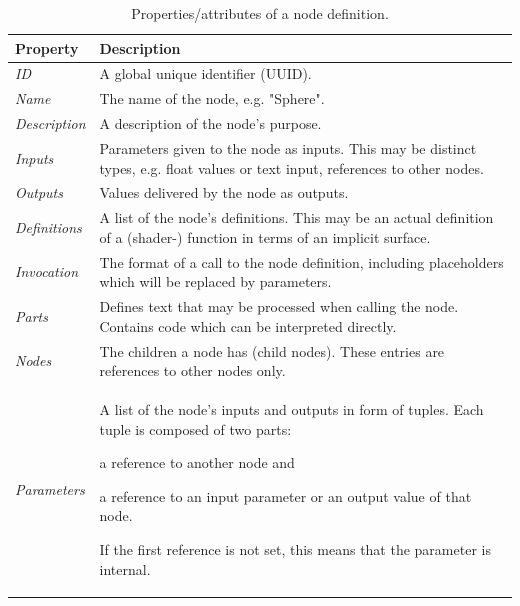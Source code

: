 \documentclass[%
    a4paper,    %
    justified,  %
    nobib,      %
    openany     %
]{tufte-book}
\newcommand{\ra}[1]{\renewcommand{\arraystretch}{#1}}
\begin{document}
\begin{table}\centering
  \ra{1.3}
  \begin{tabularx}{\textwidth}{@{}lX@{}}
    \toprule
    \textbf{Property}    & \textbf{Description}                                         \\
    \hline
    \textit{ID}          & A global unique identifier (UUID\protect\footnotemark[1]{}). \\
    \textit{Name}        & The name of the node, e.g. "Sphere".                         \\
    \textit{Description} & A description of the node's purpose.                         \\
    \textit{Inputs}      & Parameters given to the node as inputs. This may be
    distinct types, e.g. float values or text input, references to other
    nodes.                                                                              \\
    \textit{Outputs}     & Values delivered by the node as outputs.                     \\
    \textit{Definitions} & A list of the node's definitions. This may be an
    actual definition of a (shader-) function in terms of an implicit surface.          \\
    \textit{Invocation}  & The format of a call to the node definition, including
    placeholders which will be replaced by parameters.                                  \\
    \textit{Parts}       & Defines text that may be processed when calling the node.
    Contains code which can be interpreted directly.                                    \\
    \textit{Nodes}       & The children a node has (child nodes). These entries are
    references to other nodes only.                                                     \\
    \textit{Parameters}  & A list of the node's inputs and outputs in form of
    tuples.
    Each tuple is composed of two parts:~\begin{enumerate*}
      \item a reference to another node and
      \item a reference to an input parameter or an output value of that node.
    \end{enumerate*} If the first reference is not set, this means that the
    parameter is internal.                                                              \\
    \bottomrule
  \end{tabularx}
  \caption{Properties/attributes of a node definition.}
  \label{table:node-definition-components}
\end{table}
\end{document}
